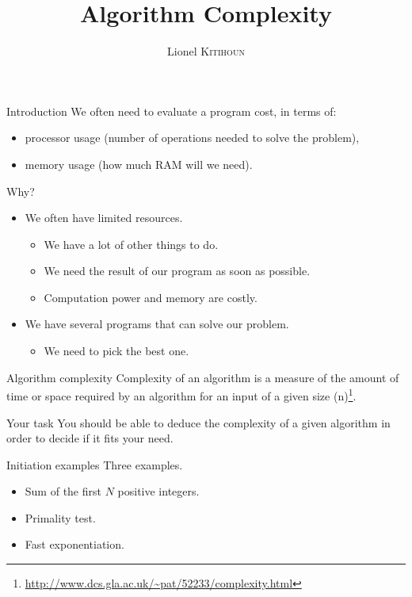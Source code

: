 \documentclass{beamer}
\title{Algorithm Complexity}
\author{Lionel \textsc{Kitihoun}}
\date{}
\begin{document}
\begin{frame}[plain]
\maketitle
\end{frame}

\begin{frame}{Introduction}
\justifying
We often need to evaluate a program cost, in terms of:
\begin{itemize}
  \item processor usage (number of operations needed to solve the problem),
  \item memory usage (how much RAM will we need).
\end{itemize}
\end{frame}

\begin{frame}{Why?}
\justifying
\begin{itemize}
  \item We often have limited resources.
    \begin{itemize}
      \item We have a lot of other things to do.
      \item We need the result of our program as soon as possible.
      \item Computation power and memory are costly.
    \end{itemize}
  \item We have several programs that can solve our problem.
    \begin{itemize}
      \item We need to pick the best one.
    \end{itemize}
\end{itemize}
\end{frame}

\begin{frame}{Algorithm complexity}
\justifying
Complexity of an algorithm is a measure of the amount of time or space required by an algorithm for an input of a given size (n)\footnote{\url{http://www.dcs.gla.ac.uk/~pat/52233/complexity.html}}.
\end{frame}

\begin{frame}{Your task}
\justifying
You should be able to deduce the complexity of a given algorithm in order to decide if it fits your need.
\end{frame}

\begin{frame}{Initiation examples}
\justifying
Three examples.
\begin{itemize}
  \item Sum of the first $N$ positive integers.
  \item Primality test.
  \item Fast exponentiation.
\end{itemize}
\end{frame}
\end{document}
